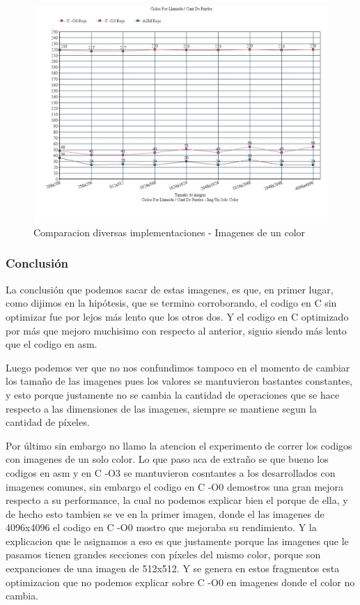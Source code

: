 \begin{figure}[h!]
\centering
\captionsetup{justification=centering}
	\includegraphics[width = 15 cm, height = 8 cm]{imagenes/mismoColor.jpg}
	\caption[center]{Comparacion diversas implementaciones - Imagenes de un color}
\end{figure}


\subsubsection{Conclusión}
\par{La conclusión que podemos sacar de estas imagenes, es que, en primer lugar, como dijimos en la hipótesis, que se termino corroborando, el codigo en C sin optimizar fue por lejos más lento que los otros dos. Y el codigo en C optimizado por más que mejoro muchisimo con respecto al anterior, siguio siendo más lento que el codigo en asm.}
\par{Luego podemos ver que no nos confundimos tampoco en el momento de cambiar los tamaño de las imagenes pues los valores se mantuvieron bastantes constantes, y esto porque justamente no se cambia la cantidad de operaciones que se hace respecto a las dimensiones de las imagenes, siempre se mantiene segun la cantidad de píxeles.}
\par{Por último sin embargo no llamo la atencion el experimento de correr los codigos con imagenes de un solo color. Lo que paso aca de extraño se que bueno los codigos en asm y en C -O3 se mantuvieron cosntantes a los desarrollados con imagenes comunes, sin embargo el codigo en C -O0 demostros una gran mejora respecto a su performance, la cual no podemos explicar bien el porque de ella, y de hecho esto tambien se ve en la primer imagen, donde el las imagenes de 4096x4096 el codigo en C -O0 mostro que mejoraba su rendimiento. Y la explicacion que le asignamos a eso es que justamente porque las imagenes que le pasamos tienen grandes secciones con píxeles del mismo color, porque son eexpanciones de una imagen de 512x512. Y se genera en estos fragmentos esta optimizacion que no podemos explicar sobre C -O0 en imagenes donde el color no cambia.}
	

